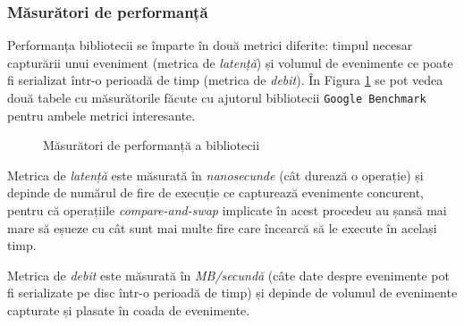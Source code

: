 \subsubsection{Măsurători de performanță}\label{library-performance}

Performanța bibliotecii se împarte în două metrici diferite: timpul
necesar capturării unui eveniment (metrica de \textit{latență}) și
volumul de evenimente ce poate fi serializat într-o perioadă de timp
(metrica de \textit{debit}). În Figura \ref{fig:lib-perf} se pot vedea
două tabele cu măsurătorile făcute cu ajutorul bibliotecii
\lstinline{Google Benchmark}\cite{GoogleBenchmark} pentru ambele metrici
interesante.

\begin{figure}[H]
\centering
{}
\caption{Măsurători de performanță a bibliotecii}
\label{fig:lib-perf}
\end{figure}

Metrica de \textit{latență} este măsurată în \textit{nanosecunde} (cât
durează o operație) și depinde de numărul de fire de execuție ce
capturează evenimente concurent, pentru că operațiile
\textit{compare-and-swap} implicate în acest procedeu au șansă mai mare
să eșueze cu cât sunt mai multe fire care încearcă să le execute în
același timp.

Metrica de \textit{debit} este măsurată în \textit{MB/secundă} (câte
date despre evenimente pot fi serializate pe disc într-o perioadă de
timp) și depinde de volumul de evenimente capturate și plasate în coada
de evenimente.
